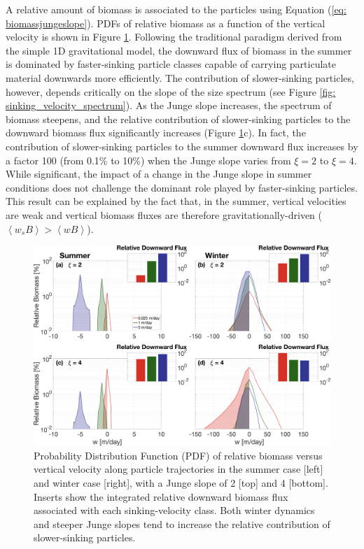 \documentclass[article,linenumbers]{agujournal2018}
\begin{document}
A relative amount of biomass is associated to the particles using Equation (\ref{eq: biomassjungeslope}). PDFs of relative biomass as a function of the vertical velocity is shown in Figure \ref{fig: biomass_export}. Following the traditional paradigm derived from the simple 1D gravitational model, the downward flux of biomass in the summer is dominated by faster-sinking particle classes capable of carrying particulate material downwards more efficiently. The contribution of slower-sinking particles, however, depends critically on the slope of the size spectrum (see Figure \ref{fig: sinking_velocity_spectrum}). As the Junge slope increases, the spectrum of biomass steepens, and the relative contribution of slower-sinking particles to the downward biomass flux significantly increases (Figure \ref{fig: biomass_export}c). In fact, the contribution of slower-sinking particles to the summer downward flux increases by a factor 100 (from 0.1\% to 10\%) when the Junge slope varies from $\xi =2$ to $\xi = 4$. While significant, the impact of a change in the Junge slope in summer conditions does not challenge the dominant role played by faster-sinking particles. This result can be explained by the fact that, in the summer, vertical velocities are weak and vertical biomass fluxes are therefore gravitationally-driven ($\left<w_sB\right> > \left<wB\right>$).

\begin{figure}[t]
	\centering
	\includegraphics[width = 1\linewidth]{figures/Fig7.png}
	\caption{Probability Distribution Function (PDF) of relative biomass versus vertical velocity along particle trajectories in the summer case [left] and winter case [right], with a Junge slope of 2 [top] and 4 [bottom]. Inserts show the integrated relative downward biomass flux associated with each sinking-velocity class. Both winter dynamics and steeper Junge slopes tend to increase the relative contribution of slower-sinking particles.}
	\label{fig: biomass_export}
\end{figure}
\end{document}
